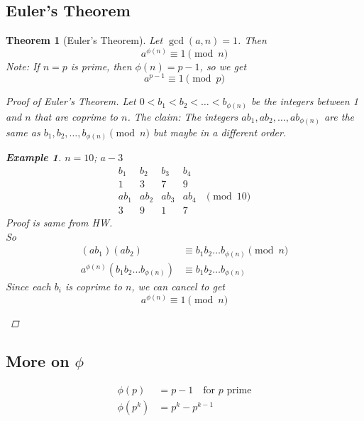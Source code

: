 \documentclass[letterpaper]{article}
\newtheorem{theorem}{Theorem}[subsection]
\newtheorem{example}{Example}[subsection]
\begin{document}
    \subsection{Euler's Theorem}
    \begin{theorem} [Euler's Theorem]
        Let $\gcd(a,n)=1$. Then 
        \[ a^{\phi(n)}\equiv 1\pmod{n} \]
        Note: If $n=p$ is prime, then $\phi(n)=p-1$, so we get 
        \[ a^{p-1}\equiv 1\pmod{p} \]
        \begin{proof} [Proof of Euler's Theorem]
            Let $0<b_1<b_2<\dots<b_{\phi(n)}$ be the integers between 
            1 and $n$ that are coprime to $n$. The claim: The integers 
            $ab_1, ab_2, \dots, ab_{\phi(n)}$ are the same as 
            $b_1,b_2,\dots,b_{\phi(n)}\pmod{n}$ but maybe in a different order.
            \begin{example}
                $n=10$; $a-3$
                \[
                \begin{matrix}
                    b_1 & b_2 & b_3 & b_4 \\
                    1 & 3 & 7 & 9 \\
                    ab_1 & ab_2 & ab_3 & ab_4 & \pmod{10} \\
                    3 & 9 & 1 & 7
                \end{matrix}
                \]
                Proof is same from HW. \\
                So
                \begin{align*}
                    (ab_1)(ab_2) &\equiv b_1b_2\dots b_{\phi(n)} \pmod{n} \\
                    a^{\phi(n)}(b_1b_2\dots b_{\phi(n)}) &\equiv b_1b_2\dots b_{\phi(n)}
                \end{align*}
                Since each $b_i$ is coprime to $n$, we can cancel to get 
                \[ a^{\phi(n)}\equiv 1\pmod{n} \]
            \end{example}
        \end{proof}
    \end{theorem}

    \subsection{More on $\phi$}
        \begin{align*}
            \phi(p) &= p-1 \quad\text{for } p \text{ prime} \\
            \phi(p^k) &= p^k - p^{k-1} 
        \end{align*}
\end{document}
